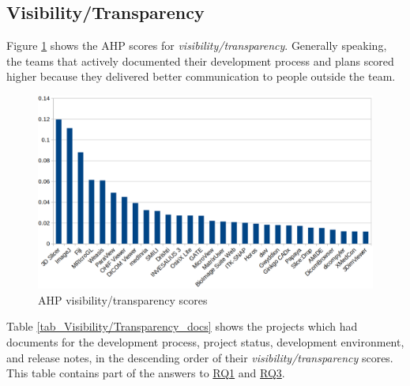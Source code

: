 \documentclass[preprint,12pt,authoryear]{elsarticle}
\begin{document}
\subsection{Visibility/Transparency} \label{sec_result_visibility_transparency}

Figure \ref{fg_visibility_transparency_scores} shows the AHP scores for
\textit{visibility/transparency}. Generally speaking, the teams that actively
documented their development process and plans scored higher because they
delivered better communication to people outside the team.

\begin{figure}[ht]
\includegraphics[scale=0.38]{figures/visibility_transparency_scores.png}
\caption{AHP visibility/transparency scores}
\label{fg_visibility_transparency_scores}
\end{figure}

Table \ref{tab_Visibility/Transparency_docs} shows the projects which had
documents for the development process, project status, development environment,
and release notes, in the descending order of their
\textit{visibility/transparency} scores. This table contains part of the answers
to \hyperlink{rq1}{RQ1} and \hyperlink{rq3}{RQ3}.
\end{document}

